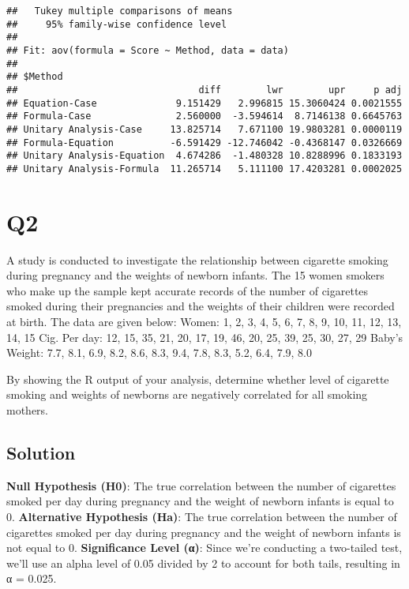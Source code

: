 \documentclass[
]{article}
\begin{document}
\begin{verbatim}
##   Tukey multiple comparisons of means
##     95% family-wise confidence level
## 
## Fit: aov(formula = Score ~ Method, data = data)
## 
## $Method
##                                diff        lwr        upr     p adj
## Equation-Case              9.151429   2.996815 15.3060424 0.0021555
## Formula-Case               2.560000  -3.594614  8.7146138 0.6645763
## Unitary Analysis-Case     13.825714   7.671100 19.9803281 0.0000119
## Formula-Equation          -6.591429 -12.746042 -0.4368147 0.0326669
## Unitary Analysis-Equation  4.674286  -1.480328 10.8288996 0.1833193
## Unitary Analysis-Formula  11.265714   5.111100 17.4203281 0.0002025
\end{verbatim}

\hypertarget{q2}{%
\section{Q2}\label{q2}}

A study is conducted to investigate the relationship between cigarette
smoking during pregnancy and the weights of newborn infants. The 15
women smokers who make up the sample kept accurate records of the number
of cigarettes smoked during their pregnancies and the weights of their
children were recorded at birth. The data are given below: Women: 1, 2,
3, 4, 5, 6, 7, 8, 9, 10, 11, 12, 13, 14, 15 Cig. Per day: 12, 15, 35,
21, 20, 17, 19, 46, 20, 25, 39, 25, 30, 27, 29 Baby's Weight: 7.7, 8.1,
6.9, 8.2, 8.6, 8.3, 9.4, 7.8, 8.3, 5.2, 6.4, 7.9, 8.0

By showing the R output of your analysis, determine whether level of
cigarette smoking and weights of newborns are negatively correlated for
all smoking mothers.

\hypertarget{solution-1}{%
\subsection{Solution}\label{solution-1}}

\textbf{Null Hypothesis (H0)}: The true correlation between the number
of cigarettes smoked per day during pregnancy and the weight of newborn
infants is equal to 0. \textbf{Alternative Hypothesis (Ha)}: The true
correlation between the number of cigarettes smoked per day during
pregnancy and the weight of newborn infants is not equal to 0.
\textbf{Significance Level (α)}: Since we're conducting a two-tailed
test, we'll use an alpha level of 0.05 divided by 2 to account for both
tails, resulting in α = 0.025.
\end{document}

